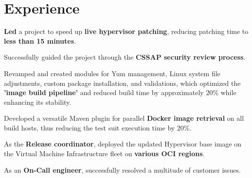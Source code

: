 \documentclass[]{resume-openfont}
\begin{document}
\hfill
\begin{minipage}[t]{0.66\textwidth}


\section{Experience}
\vspace{\topsep} %
\vspace{\topsep} %
\begin{tightemize}
\item \textbf{Led} a project to speed up \textbf{live hypervisor patching}, reducing patching time to \textbf{less than 15 minutes}.
\item Successfully guided the project through the \textbf{CSSAP security review process}.
\item Revamped and created modules for Yum management, Linux system file adjustments, custom package installation, and validations, which optimized the \textbf{'image build pipeline'} and reduced build time by approximately 20\% while enhancing its stability.
\item Developed a versatile Maven plugin for parallel \textbf{Docker image retrieval} on all build hosts, thus reducing the test suit execution time by 20\%.
\item As the \textbf{Release coordinator}, deployed the updated Hypervisor base image on the Virtual Machine Infrastructure fleet on \textbf{various OCI regions}.
\item As an \textbf{On-Call engineer}, successfully resolved a multitude of customer issues.
\end{tightemize}
\sectionsep


\end{minipage}
\end{document}

